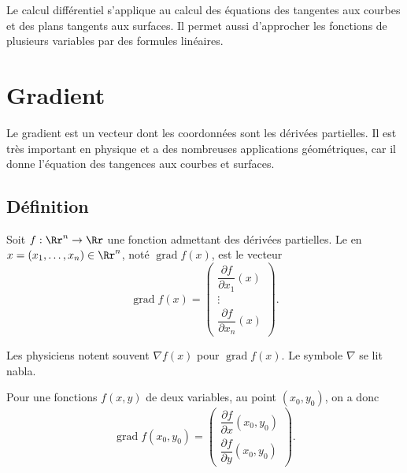 \documentclass[12pt, class=report,crop=false]{standalone}
\begin{document}

\newcommand{\grad}{\operatorname{grad}} %


%
%
%

Le calcul différentiel s'applique au calcul des équations des tangentes aux courbes et des plans tangents aux surfaces.
Il permet aussi d'approcher les fonctions de plusieurs variables par des formules linéaires.


\section{Gradient}

Le gradient est un vecteur dont les coordonnées sont les dérivées partielles. 
Il est très important en physique et a des nombreuses applications géométriques, car il donne l'équation des tangences aux courbes et surfaces.

\subsection{Définition}

\begin{definition}
Soit $f : \Rr^n \to \Rr$ une fonction admettant des dérivées partielles.
Le  en $x = (x_1,\ldots,x_n) \in \Rr^n$, noté 
$\grad f (x)$, est le vecteur 
$$\grad f (x) =
\begin{pmatrix} \dfrac{\partial f}{\partial x_{1}} (x)\\ \vdots \\ \dfrac{\partial f}{\partial x_n}(x)\end{pmatrix}.$$
\end{definition}

Les physiciens notent souvent $\nabla f (x)$ pour $\grad f (x)$.
Le symbole $\nabla$ se lit \og{}nabla\fg{}.

\bigskip

Pour une fonctions $f(x,y)$ de deux variables, au point $(x_0,y_0)$, on a donc
$$\grad f(x_0,y_0) = \begin{pmatrix}  \dfrac{\partial f}{\partial x} (x_0,y_0) \\ \dfrac{\partial f}{\partial y}(x_0,y_0)\end{pmatrix}.$$
\end{document}

